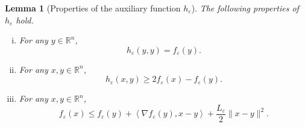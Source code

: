 \documentclass[11pt]{article}
\numberwithin{equation}{section}
\newtheorem{lemma}{Lemma}[proposition]
\begin{document}
\begin{lemma}[Properties of the auxiliary function $h_{\varepsilon}$]\label{State_h_prop}
The following properties of $h_{\varepsilon}$ hold.
\begin{enumerate}[(i)]
	\item For any $y \in \mathbb{R}^n$, \label{State_h_prop1}
	\begin{equation*}
		h_{\varepsilon}(y,y) = f_{\varepsilon}(y) .
	\end{equation*}
	\item For any $x,y \in \mathbb{R}^n$, \label{State_h_prop2}
	\begin{equation*}
		h_{\varepsilon}(x,y) \geq 2f_{\varepsilon}(x) - f_{\varepsilon}(y) .
	\end{equation*}
	\item For any $x,y \in \mathbb{R}^n$, \label{State_h_prop4}
	\begin{equation*}
		f_{\varepsilon}(x) \leq f_{\varepsilon}(y) + \left\langle \nabla f_{\varepsilon}(y), x-y \right\rangle + \frac{L_{\varepsilon}}{2}\|x-y\|^2 .
	\end{equation*}
\end{enumerate}
\end{lemma}
\end{document}
